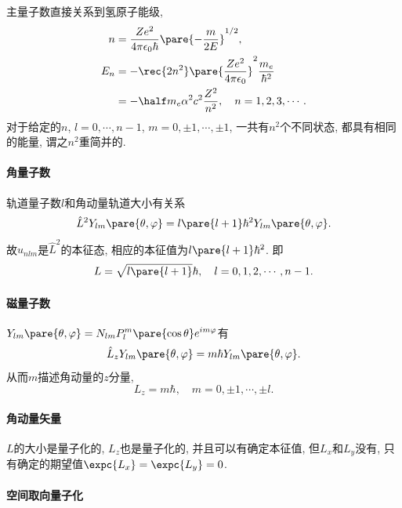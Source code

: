 \documentclass[hidelinks]{ctexart}
\begin{document}
主量子数直接关系到氢原子能级,
\begin{align*}
    n &= \frac{Ze^2}{4\pi\epsilon_0 \hbar} \pare{-\frac{m}{2E}}^{1/2}, \\
    E_n &= -\rec{2n^2} \pare{\frac{Ze^2}{4\pi\epsilon_0}}^2 \frac{m_e}{\hbar^2} \\
    &= -\half m_e \alpha^2 c^2 \frac{Z^2}{n^2},\quad n = 1,2,3,\cdots.
\end{align*}
对于给定的$n$, $l = 0,\cdots, n-1$, $m = 0,\pm 1,\cdots, \pm 1$, 一共有$n^2$个不同状态, 都具有相同的能量, 谓之$n^2$重简并的.


\paragraph{角量子数} %
\label{par:角量子数}

轨道量子数$l$和角动量轨道大小有关系
\[ \hat{L}^2 Y_{lm}\pare{\theta,\varphi} = l\pare{l+1} \hbar^2 Y_{lm}\pare{\theta,\varphi}. \]
故$u_{nlm}$是$\hat{L}^2$的本征态, 相应的本征值为$l\pare{l+1}\hbar^2$. 即
\[ L = \sqrt{l\pare{l+1}}\hbar,\quad l = 0,1,2,\cdots, n-1. \]


\paragraph{磁量子数} %
\label{par:磁量子数}

$\displaystyle Y_{lm}\pare{\theta,\varphi} = N_{lm} P_l^m \pare{\cos\theta} e^{im\varphi}$有
\[ \hat{L}_z Y_{lm}\pare{\theta,\varphi} = m\hbar Y_{lm}\pare{\theta,\varphi}. \]
从而$m$描述角动量的$z$分量,
\[ L_z = m\hbar,\quad m = 0,\pm 1,\cdots, \pm l. \]


\paragraph{角动量矢量} %
\label{par:角动量矢量}

$L$的大小是量子化的, $L_z$也是量子化的, 并且可以有确定本征值, 但$L_x$和$L_y$没有, 只有确定的期望值$\expc{L_x} = \expc{L_y} = 0$.


\paragraph{空间取向量子化} %
\label{par:空间取向量子化}
\end{document}
